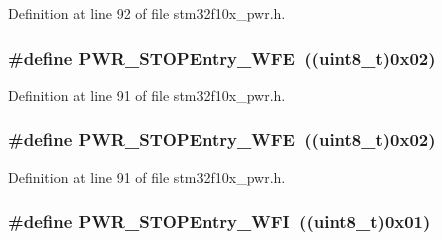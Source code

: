 Definition at line 92 of file stm32f10x\+\_\+pwr.\+h.

\subsubsection[{\texorpdfstring{P\+W\+R\+\_\+\+S\+T\+O\+P\+Entry\+\_\+\+W\+FE}{PWR_STOPEntry_WFE}}]{\setlength{\rightskip}{0pt plus 5cm}\#define P\+W\+R\+\_\+\+S\+T\+O\+P\+Entry\+\_\+\+W\+FE~(({\bf uint8\+\_\+t})0x02)}\hypertarget{group___s_t_o_p__mode__entry_gaac98ac55fb8764121d4168d99c9b369e}{}\label{group___s_t_o_p__mode__entry_gaac98ac55fb8764121d4168d99c9b369e}


Definition at line 91 of file stm32f10x\+\_\+pwr.\+h.

\subsubsection[{\texorpdfstring{P\+W\+R\+\_\+\+S\+T\+O\+P\+Entry\+\_\+\+W\+FE}{PWR_STOPEntry_WFE}}]{\setlength{\rightskip}{0pt plus 5cm}\#define P\+W\+R\+\_\+\+S\+T\+O\+P\+Entry\+\_\+\+W\+FE~(({\bf uint8\+\_\+t})0x02)}\hypertarget{group___s_t_o_p__mode__entry_gaac98ac55fb8764121d4168d99c9b369e}{}\label{group___s_t_o_p__mode__entry_gaac98ac55fb8764121d4168d99c9b369e}


Definition at line 91 of file stm32f10x\+\_\+pwr.\+h.

\subsubsection[{\texorpdfstring{P\+W\+R\+\_\+\+S\+T\+O\+P\+Entry\+\_\+\+W\+FI}{PWR_STOPEntry_WFI}}]{\setlength{\rightskip}{0pt plus 5cm}\#define P\+W\+R\+\_\+\+S\+T\+O\+P\+Entry\+\_\+\+W\+FI~(({\bf uint8\+\_\+t})0x01)}\hypertarget{group___s_t_o_p__mode__entry_gaa1e1362f3d0b93e8f5f674e18cfc96c4}{}\label{group___s_t_o_p__mode__entry_gaa1e1362f3d0b93e8f5f674e18cfc96c4}


